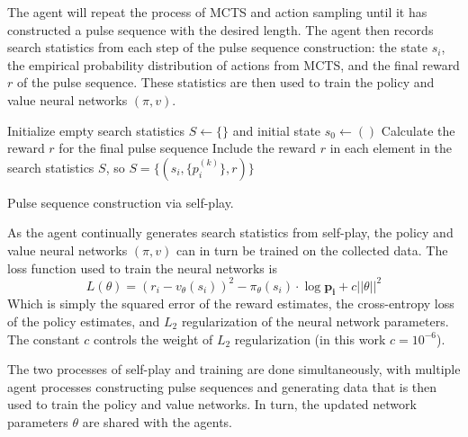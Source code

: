 The agent will repeat the process of MCTS and action sampling until it has constructed a pulse sequence with the desired length. The agent then records search statistics from each step of the pulse sequence construction: the state $s_i$, the empirical probability distribution of actions from MCTS, and the final reward $r$ of the pulse sequence. These statistics are then used to train the policy and value neural networks $(\pi, v)$.


\begin{algorithm}[H]
\BlankLine
Initialize empty search statistics $S \leftarrow \{\}$
and initial state $s_0 \leftarrow ()$
\;
Calculate the reward $r$ for the final pulse sequence \;
Include the reward $r$ in each element in the search statistics $S$, so $S = \{ (s_i, \{p_i^{(k)}\}, r) \}$ \;
\caption{Pulse sequence construction via self-play. \label{al:make_sequence}}
\end{algorithm}

As the agent continually generates search statistics from self-play, the policy and value neural networks $(\pi, v)$ can in turn be trained on the collected data. The loss function used to train the neural networks is
\begin{equation}\label{eq:az_loss}
    L(\theta) = (r_i - v_\theta(s_i))^2 - \pi_\theta(s_i) \cdot \log \mathbf{p_i} + c ||\theta||^2
\end{equation}
Which is simply the squared error of the reward estimates, the cross-entropy loss of the policy estimates, and $L_2$ regularization of the neural network parameters. The constant $c$ controls the weight of $L_2$ regularization (in this work $c = 10^{-6}$).

The two processes of self-play and training are done simultaneously, with multiple agent processes constructing pulse sequences and generating data that is then used to train the policy and value networks. In turn, the updated network parameters $\theta$ are shared with the agents.


